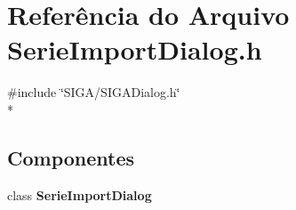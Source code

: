 \section{Referência do Arquivo Serie\+Import\+Dialog.\+h}
\label{_serie_import_dialog_8h}
{\ttfamily \#include \char`\"{}S\+I\+G\+A/\+S\+I\+G\+A\+Dialog.\+h\char`\"{}}\\*
\subsection*{Componentes}
\begin{DoxyCompactItemize}
\item 
class {\bf Serie\+Import\+Dialog}
\end{DoxyCompactItemize}
